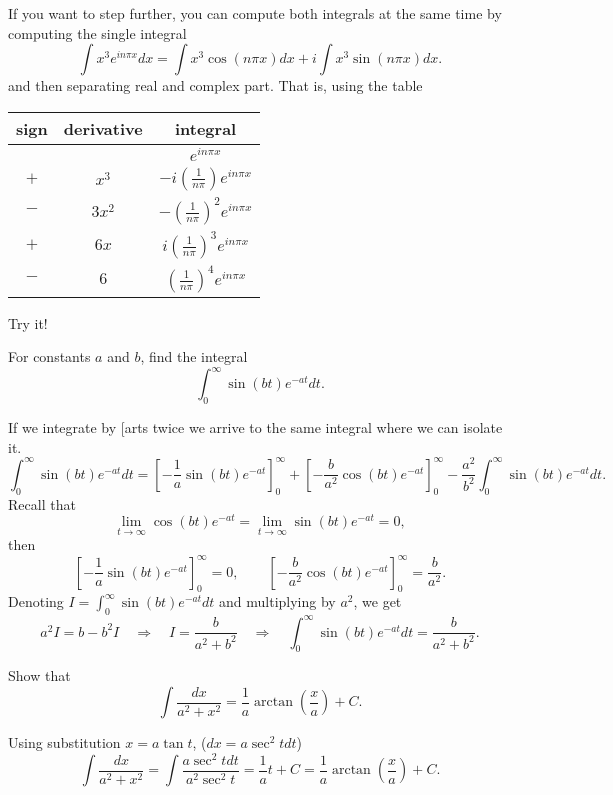 \documentclass[11pt]{article}
\begin{document}
\begin{solution}
If you want to step further, you can compute both integrals at the same time by computing the single integral
\[ \int x^{3}e^{i n\pi x}dx = \int x^{3}\cos(n\pi x)dx + i \int x^{3}\sin(n\pi x)dx.\]
and then separating real and complex part. That is, using the table
\begin{center}
\begin{tabular}{c|c|c}
sign & derivative & integral \\
\hline
  &          & $ e^{i n\pi x}$ \\
$+$ & $x^{3}$  & $-i\left( \frac{1}{n \pi} \right) e^{i n\pi x}$ \\
$-$ & $3x^{2}$ & $- \left( \frac{1}{n \pi} \right)^{2} e^{i n\pi x}$ \\
$+$ & $6x$     & $ i\left( \frac{1}{n \pi} \right)^{3} e^{i n\pi x}$ \\
$-$ & $6$      & $  \left( \frac{1}{n \pi} \right)^{4} e^{i n\pi x}$
\end{tabular}
\end{center} 
Try it!
\end{solution}



\begin{problem}
For constants $a$ and $b$, find the integral
\[\int_{0}^{\infty} \sin(bt)e^{-at}dt.\]
\end{problem}
\begin{solution}
If we integrate by [arts twice we arrive to the same integral where we can isolate it.
\[\int_{0}^{\infty} \sin(bt)e^{-at}dt  = \left[ -\frac{1}{a}\sin (bt)e^{-at}\right]^{\infty}_{0} + \left[- \frac{b}{a^{2}}\cos (bt)e^{-at}\right]^{\infty}_{0} - \frac{a^{2}}{b^{2}}\int_{0}^{\infty}\sin(bt)e^{-at}dt.\]
Recall that
\[\lim_{t\rightarrow{\infty}}\cos(bt)e^{-at}=\lim_{t\rightarrow{\infty}}\sin(bt)e^{-at}=0,\]
then 
\[\left[ -\frac{1}{a}\sin (bt)e^{-at}\right]^{\infty}_{0} = 0 , \qquad \left[ -\frac{b}{a^{2}}\cos (bt)e^{-at}\right]^{\infty}_{0} = \frac{b}{a^{2}}.\]
Denoting $I=\int_{0}^{\infty} \sin(bt)e^{-at}dt$ and multiplying by $a^{2}$, we get
\[a^{2}I=b - b^{2}I \quad \Rightarrow \quad I= \frac{b}{a^{2}+b^{2}} \quad \Rightarrow \quad  \boxed{\int_{0}^{\infty} \sin(bt)e^{-at}dt= \frac{b}{a^{2}+b^{2}}}.\]
\end{solution}



\begin{problem}
Show that
\[\int \frac{dx}{a^{2}+x^{2}}=\frac{1}{a}\arctan \left( \frac{x}{a} \right)+C.\]
\end{problem}
\begin{solution}
Using substitution $x = a \tan t$, ($dx = a \sec^{2}tdt$)
\[\int \frac{dx}{a^{2}+x^{2}} = \int \frac{a\sec^{2} t dt}{a^{2}\sec^{2}t} = \frac{1}{a}t + C = \boxed{\frac{1}{a}\arctan\left( \frac{x}{a} \right) + C}.\]
\end{solution}
\end{document}
